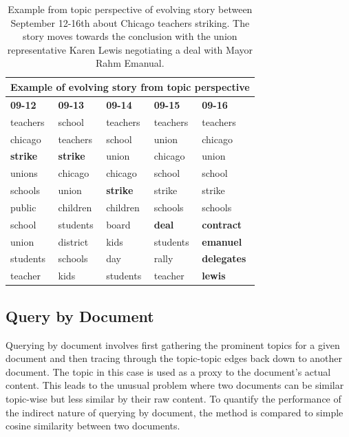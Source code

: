 \documentclass[10pt]{article}
\begin{document}
\begin{table}
\begin{center}
\begin{tabular}{|l|l|l|l|l|}
  \hline
  \multicolumn{5}{|c|}{Example of evolving story from topic perspective} \\
  \hline
  \textbf{09-12}&\textbf{09-13}&\textbf{09-14}&\textbf{09-15}&\textbf{09-16}\\
  \hline
teachers & school & teachers & teachers & teachers \\
chicago & teachers & school &  union & chicago \\
\textbf{strike} &  \textbf{strike} & union & chicago & union \\
unions &  chicago & chicago & school & school \\
schools & union &   \textbf{strike} & strike & strike \\
public & children &  children & schools & schools \\
school & students & board &   \textbf{deal} &   \textbf{contract} \\
union & district & kids & students &  \textbf{emanuel} \\
students & schools & day & rally & \textbf{delegates} \\
teacher &  kids & students & teacher & \textbf{lewis} \\
\hline
\end{tabular}
\caption{Example from topic perspective of evolving story between September 12-16th about Chicago teachers striking.  The story moves towards the conclusion with the union representative Karen Lewis negotiating a deal with Mayor Rahm Emanual. }
\end{center}
\end{table}

\subsection {Query by Document}

Querying by document involves first gathering the prominent topics for a given document and then tracing through the topic-topic edges back down to another document.  The topic in this case is used as a proxy to the document's actual content.  This leads to the unusual problem where two documents can be similar topic-wise but less similar by their raw content.  To quantify the performance of the indirect nature of querying by document, the method is compared to simple cosine similarity between two documents.  
\end{document}
